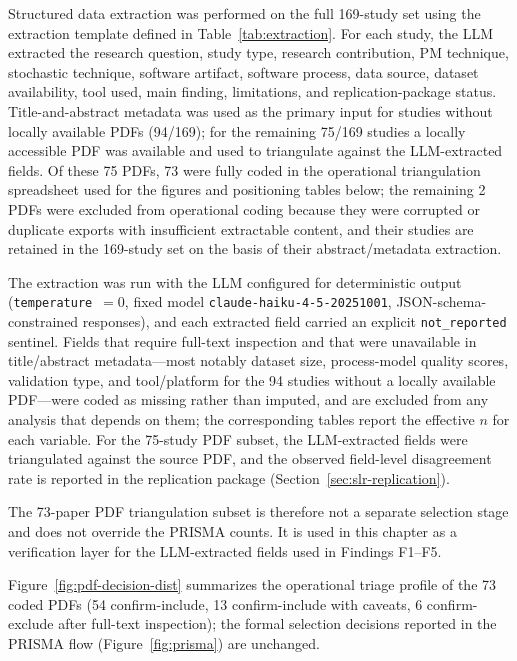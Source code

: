 Structured data extraction was performed on the full 169-study set using the
extraction template defined in Table~\ref{tab:extraction}. For each study,
the LLM extracted the research question, study type, research contribution,
PM technique, stochastic technique, software artifact, software process, data
source, dataset availability, tool used, main finding, limitations, and
replication-package status. Title-and-abstract metadata was used as the
primary input for studies without locally available PDFs (94/169); for the
remaining 75/169 studies a locally accessible PDF was available and used to
triangulate against the LLM-extracted fields. Of these 75 PDFs, 73 were
fully coded in the operational triangulation spreadsheet used for the
figures and positioning tables below; the remaining 2 PDFs were excluded
from operational coding because they were corrupted or duplicate exports
with insufficient extractable content, and their studies are retained in the
169-study set on the basis of their abstract/metadata extraction.

The extraction was run with the LLM configured for deterministic output
(\texttt{temperature}~$=0$, fixed model \texttt{claude-haiku-4-5-20251001},
JSON-schema-constrained responses), and each extracted field carried an
explicit \texttt{not\_reported} sentinel. Fields that require full-text
inspection and that were unavailable in title/abstract metadata---most
notably dataset size, process-model quality scores, validation type, and
tool/platform for the 94 studies without a locally available PDF---were
coded as missing rather than imputed, and are excluded from any analysis
that depends on them; the corresponding tables report the effective $n$ for
each variable. For the 75-study PDF subset, the LLM-extracted fields were
triangulated against the source PDF, and the observed field-level
disagreement rate is reported in the replication package
(Section~\ref{sec:slr-replication}).

The 73-paper PDF triangulation subset is therefore not a separate selection
stage and does not override the PRISMA counts. It is used in this chapter as
a verification layer for the LLM-extracted fields used in Findings F1--F5.

Figure~\ref{fig:pdf-decision-dist} summarizes the operational triage profile
of the 73 coded PDFs (54 confirm-include, 13 confirm-include with
caveats, 6 confirm-exclude after full-text inspection); the formal selection
decisions reported in the PRISMA flow (Figure~\ref{fig:prisma}) are
unchanged.

